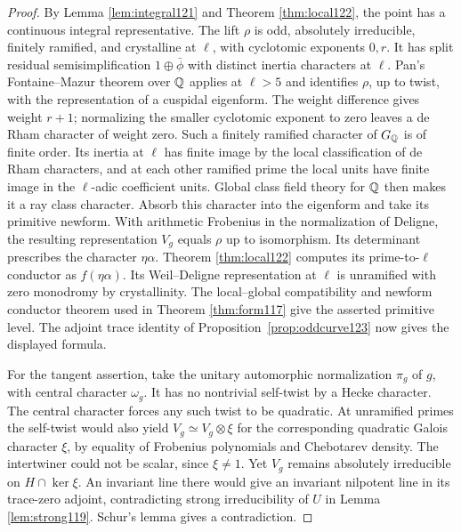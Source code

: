 \documentclass[a4paper,11pt]{article}
\theoremstyle{definition}
\theoremstyle{remark}
\numberwithin{equation}{section}
\begin{document}
\begin{proof}
By Lemma \ref{lem:integral121} and Theorem \ref{thm:local122}, the point has a continuous
integral representative. The lift \(\rho\) is odd,
absolutely irreducible, finitely ramified, and crystalline at
\(\ell\), with cyclotomic exponents \(0,r\). It has split
residual semisimplification \(1\oplus\bar\phi\) with distinct
inertia characters at \(\ell\). Pan's Fontaine--Mazur theorem
over \(\mathbb Q\) applies at \(\ell>5\) and identifies \(\rho\),
up to twist, with the representation of a cuspidal eigenform.
The weight difference gives weight \(r+1\); normalizing the
smaller cyclotomic exponent to zero leaves a de Rham character
of weight zero. Such a finitely ramified character of \(G_\mathbb Q\)
is of finite order. Its inertia at \(\ell\) has finite image by
the local classification of de Rham characters, and at each
other ramified prime the local units have finite image in the
\(\ell\)-adic coefficient units. Global class field theory for
\(\mathbb Q\) then makes it a ray class character. Absorb this
character into the eigenform and take its primitive newform.
With arithmetic Frobenius in the normalization of Deligne,
the resulting representation \(V_g\) equals \(\rho\) up to
isomorphism. Its determinant prescribes the character
\(\eta\alpha\). Theorem \ref{thm:local122} computes its
prime-to-\(\ell\) conductor as \(f(\eta\alpha)\). Its
Weil--Deligne representation at \(\ell\) is unramified with
zero monodromy by crystallinity. The local--global compatibility
and newform conductor theorem used in Theorem \ref{thm:form117}
give the asserted primitive level. The adjoint trace identity
of Proposition~\ref{prop:oddcurve123} now gives the displayed
formula.~\cite{VI-IV-I-pan123,VI-IV-I-compat123}

For the tangent assertion, take the unitary automorphic
normalization \(\pi_g\) of \(g\), with central character
\(\omega_g\). It has no nontrivial self-twist by a Hecke
character. The central character forces any such twist to
be quadratic. At unramified primes the self-twist would also
yield \(V_g\simeq V_g\otimes\xi\) for the corresponding
quadratic Galois character \(\xi\), by equality of Frobenius
polynomials and Chebotarev density. The intertwiner could not
be scalar, since \(\xi\ne1\). Yet \(V_g\) remains absolutely
irreducible on \(H\cap\ker\xi\). An invariant line there would
give an invariant nilpotent line in its trace-zero adjoint,
contradicting strong irreducibility of \(U\) in
Lemma \ref{lem:strong119}.
Schur's lemma gives a contradiction.


\end{proof}
\end{document}
